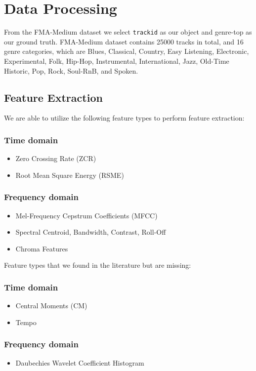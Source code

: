 \section{Data Processing}


From the FMA-Medium dataset we select \texttt{trackid} as our object and genre-top as our ground truth. FMA-Medium dataset contains 25000 tracks in total, and 16 genre categories, which are Blues, Classical, Country, Easy Listening, Electronic, Experimental, Folk, Hip-Hop, Instrumental, International, Jazz, Old-Time Historic, Pop, Rock, Soul-RnB, and Spoken.

\subsection{Feature Extraction}
We are able to utilize the following feature types to perform feature extraction:

\subsubsection{Time domain}
\begin{itemize}
    \item Zero Crossing Rate (ZCR) \cite{Li2006}
    \item Root Mean Square Energy (RSME) \cite{Tao}
\end{itemize}

\subsubsection{Frequency domain}

\begin{itemize}
    \item Mel-Frequency Cepstrum Coefficients (MFCC) \cite{Li2006, Nanni2016, Hoffmann2016, Lim2012}
    \item Spectral Centroid, Bandwidth, Contrast, Roll-Off \cite{Li2006, Li2005}
    \item Chroma Features
\end{itemize}
Feature types that we found in the literature but are missing:

\subsubsection{Time domain}
\begin{itemize}
    \item Central Moments (CM)
    \item Tempo
\end{itemize}

\subsubsection{Frequency domain}

\begin{itemize}
    \item Daubechies Wavelet Coefficient Histogram \cite{Li2006}
    
\end{itemize}
